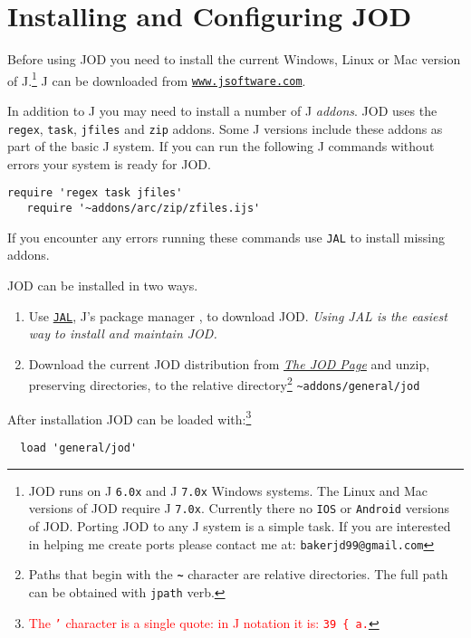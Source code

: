 \section{Installing and Configuring JOD}

Before using JOD you need to install the current Windows, Linux or Mac version of J.\footnote{JOD runs on 
 J \texttt{6.0x} and  J \texttt{7.0x} Windows systems. The Linux and Mac versions of JOD require J
\texttt{7.0x}. Currently there no \texttt{IOS} or \texttt{Android} versions of JOD. Porting JOD 
to any J system is a simple task.
If you are interested in helping me create ports please contact me at:  
\texttt{bakerjd99@gmail.com}
} J can be downloaded from \href{http://www.jsoftware.com}{\texttt{www.jsoftware.com}}.

In addition to J you may need to install a number of J \emph{addons}. JOD uses the
\texttt{regex}, \texttt{task}, \texttt{jfiles} and \texttt{zip} addons.  Some J versions
include these addons as part of the basic J system. If you can run the following J commands
without errors your system is ready for JOD. 
\begin{lstlisting}[frame=single,framerule=0pt,label=lst:reqaddons]
   require 'regex task jfiles'
   require '~addons/arc/zip/zfiles.ijs'
\end{lstlisting}
If you encounter any errors running these commands use \texttt{JAL} to install 
missing addons.
 
JOD can be installed in two ways.  
\begin{enumerate}
	\item Use \href{http://202.67.223.49/jwiki/Addons/general/jod}{\texttt{JAL}}, J's package manager 
	\cite{jwiki:jal}, to download JOD. \emph{Using JAL is the easiest way to install and maintain JOD.}
	\item Download the current JOD distribution from \href{http://bakerjd99.wordpress.com/the-jod-page/}{\emph{The JOD Page}} \cite{baker:jodpages} and unzip, preserving directories, to the relative directory\footnote{Paths that begin with the \textbf{\texttt{\~}} character are relative directories. The full path can be obtained with \texttt{jpath} verb. } \verb|~addons/general/jod|
\end{enumerate}

After installation JOD can be loaded with:\footnote{
\textcolor{red}{The \texttt{'} character is a single quote: in J notation it is: \texttt{39 \{ a.}}
}
\begin{verbatim}
  load 'general/jod'
\end{verbatim}

